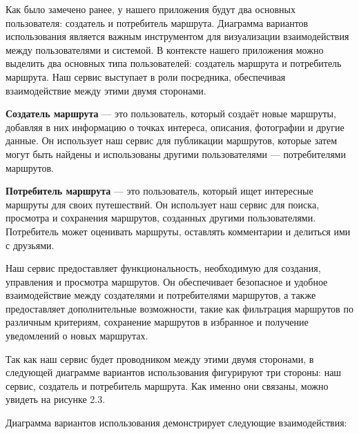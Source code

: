 Как было замечено ранее, у нашего приложения будут два основных пользователя: создатель и потребитель маршрута. Диаграмма вариантов использования является важным инструментом для визуализации взаимодействия между пользователями и системой. В контексте нашего приложения можно выделить два основных типа пользователей: создатель маршрута и потребитель маршрута. Наш сервис выступает в роли посредника, обеспечивая взаимодействие между этими двумя сторонами.

\textbf{Создатель маршрута} — это пользователь, который создаёт новые маршруты, добавляя в них информацию о точках интереса, описания, фотографии и другие данные. Он использует наш сервис для публикации маршрутов, которые затем могут быть найдены и использованы другими пользователями — потребителями маршрутов.

\textbf{Потребитель маршрута} — это пользователь, который ищет интересные маршруты для своих путешествий. Он использует наш сервис для поиска, просмотра и сохранения маршрутов, созданных другими пользователями. Потребитель может оценивать маршруты, оставлять комментарии и делиться ими с друзьями.

Наш сервис предоставляет функциональность, необходимую для создания, управления и просмотра маршрутов. Он обеспечивает безопасное и удобное взаимодействие между создателями и потребителями маршрутов, а также предоставляет дополнительные возможности, такие как фильтрация маршрутов по различным критериям, сохранение маршрутов в избранное и получение уведомлений о новых маршрутах.

Так как наш сервис будет проводником между этими двумя сторонами, в следующей диаграмме вариантов использования фигурируют три стороны: наш сервис, создатель и потребитель маршрута. Как именно они связаны, можно увидеть на рисунке 2.3.

Диаграмма вариантов использования демонстрирует следующие взаимодействия:


